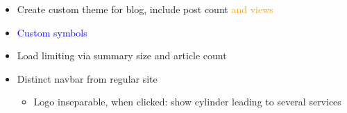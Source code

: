 \documentclass{article}
\begin{document}
{\begin{itemize}
\begin{itemize}[label=$\hookrightarrow$, leftmargin=3mm]
          \begin{itemize}[label=$\hookrightarrow$, leftmargin=1.7mm]
            \item May use to obscure articles and release on specific time
          \end{itemize}
        \item Create custom theme for blog, include post count \textcolor{orange}{and views}
        \item \textcolor{blue}{Custom symbols}
        \item Load limiting via summary size and article count
        \item Distinct navbar from regular site
          \begin{itemize}[label=$\hookrightarrow$, leftmargin=1.7mm]
            \item Logo inseparable, when clicked: show cylinder leading to several services
          \end{itemize}
      \end{itemize}
  \end{itemize}
}
{

}

\deploy
{

}
{

}

\report
{

}
\end{document}
